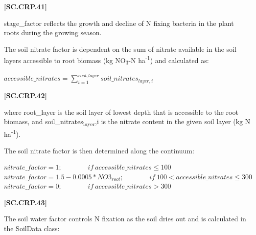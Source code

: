             {\raggedleft \textbf{[SC.CRP.41]}\par}
            \vspace{0.5cm}

stage\_factor reflects the growth and decline of N fixing bacteria in the plant roots during the growing season.

The soil nitrate factor is dependent on the sum of  nitrate available in the soil layers accessible to root biomass (kg NO\textsubscript{3}-N ha\textsuperscript{-1}) and calculated as:
   \vspace{0.2cm}

    \begin{center}
        \(accessible\_nitrates=\displaystyle \sum_{i=1}^{root\_layer}soil\_nitrates_{layer,i}\) 
    \end{center}
        \vspace{0.5cm}
    
            {\raggedleft \textbf{[SC.CRP.42]}\par}
            \vspace{0.5cm}
            
where root\_layer is the soil layer of lowest depth that is accessible to the root biomass, and soil\_nitrates\textsubscript{layer},i is the nitrate content in the given soil layer (kg N ha\textsuperscript{-1}).

The soil nitrate factor is then determined along the continuum:
   \vspace{0.2cm}

    \begin{center}
        \(nitrate\_factor=1;\ \ \ \ \ \ \ \ \ \ \ \ \ \ \ \ \ if\ accessible\_nitrates \leq 100 \) \\
        \(nitrate\_factor=1.5-0.0005 * NO3_{root};\ \ \ \ \ \ \ \ \ \ \ \ \ \ \ \ \ if\ 100 < accessible\_nitrates \leq 300 \) \\
        \(nitrate\_factor=0;\ \ \ \ \ \ \ \ \ \ \ \ \ \ \ \ \ if\ accessible\_nitrates > 300 \) 
    \end{center}
        \vspace{0.5cm}
    
            {\raggedleft \textbf{[SC.CRP.43]}\par}
            \vspace{0.5cm}

The soil water factor controls N fixation as the soil dries out and is calculated in the SoilData class: 
   \vspace{0.2cm}

